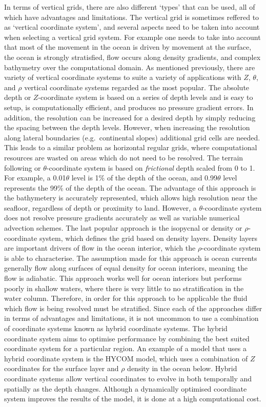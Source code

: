 \documentclass[
]{article}
\begin{document}
In terms of vertical grids, there are also different `types' that can be
used, all of which have advantages and limitations. The vertical grid is
sometimes reffered to as `vertical coordinate system', and several
aspects need to be taken into account when selecting a vertical grid
system. For example one needs to take into account that most of the
movement in the ocean is driven by movement at the surface, the ocean is
strongly stratisfied, flow occurs along density gradients, and complex
bathymetry over the computational domain. As mentioned previously, there
are variety of vertical coordinate systems to suite a variety of
applications with \(Z\), \(\theta\), and \(\rho\) vertical coordinate
systems regarded as the most popular. The absolute depth or
\(Z\)-coordinate system is based on a series of depth levels and is easy
to setup, is computationally efficient, and produces no pressure
gradient errors. In addition, the resolution can be increased for a
desired depth by simply reducing the spacing between the depth levels.
However, when increasing the resolution along lateral boundaries
(e.g.~continental slopes) additional grid cells are needed. This leads
to a similar problem as horizontal regular grids, where computational
resources are wasted on areas which do not need to be resolved. The
terrain following or \(\theta\)-coordinate system is based on
\emph{frictional} depth scaled from 0 to 1. For example, a
0.01\(\theta\) level is 1\% of the depth of the ocean, and
0.99\(\theta\) level represents the 99\% of the depth of the ocean. The
advantage of this approach is the bathymetery is accurately represented,
which allows high resolution near the seafloor, regardless of depth or
proximity to land. However, a \(\theta\)-coordinate system does not
resolve pressure gradients accurately as well as variable numerical
advection schemes. The last popular approach is the isopycnal or density
or \(\rho\)-coordinate system, which defines the grid based on density
layers. Density layers are important drivers of flow in the ocean
interior, which the \(\rho\)-coordinate system is able to characterise.
The assumption made for this approach is ocean currents generally flow
along surfaces of equal density for ocean interiors, meaning the flow is
adiabatic. This approach works well for ocean interiors but performs
poorly in shallow waters, where there is very little to no
stratification in the water column. Therefore, in order for this
approach to be applicable the fluid which flow is being resolved must be
stratified. Since each of the approaches differ in terms of advantages
and limitations, it is not uncommon to use a combination of coordinate
systems known as hybrid coordinate systems. The hybrid coordinate system
aims to optimise performance by combining the best suited coordinate
system for a particular region. An example of a model that uses a hybrid
coordinate system is the HYCOM model, which uses a combination of \(Z\)
coordinates for the surface layer and \(\rho\) density in the ocean
below. Hybrid coordinate systems allow vertical coordinates to evolve in
both temporally and spatially as the depth changes. Although a
dynamically optimised coordinate system improves the results of the
model, it is done at a high computational cost.
\end{document}

